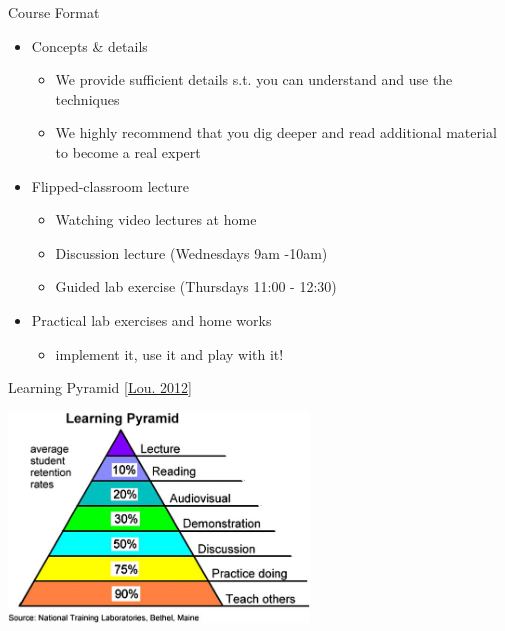 \documentclass[aspectratio=169,handout]{../latex_main/tntbeamer}  %
\begin{document}
\begin{frame}[c]{Course Format}

\begin{itemize}
	\item Concepts \& details
	\begin{itemize}
	  \item We provide sufficient details s.t. you can understand and use the techniques
	  \item We highly recommend that you dig deeper and read additional material to become a real expert
	\end{itemize}
	\smallskip
	\item Flipped-classroom lecture
	\begin{itemize}
        \item Watching video lectures at home
	  \item Discussion lecture (Wednesdays \alert{9am -10am})
        \item Guided lab exercise (Thursdays 11:00 - 12:30)
	\end{itemize}
	\smallskip
	\item Practical lab exercises and home works
	\begin{itemize}
	  \item implement it, use it and play with it!
	\end{itemize}
\end{itemize}

\end{frame}
\begin{frame}[c]{Learning Pyramid [\href{https://www.researchgate.net/publication/221801860_Applying_principles_from_Scientific_Foundations_for_Future_Physicians_to_teaching_chemistry_in_the_department_of_medicine_at_Chang_Gung_University}{Lou. 2012}]}

\centering
\includegraphics[width=0.6\textwidth]{figures/The-learning-pyramid-from-NTL-Institute-for-Applied-Behavioral-Science.jpg}

\end{frame}
\end{document}
